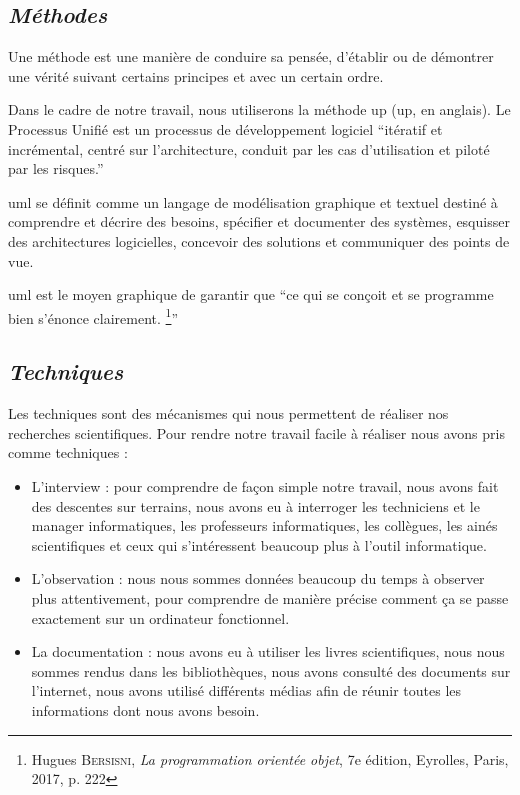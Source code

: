         \subsection[Méthodes]{\textit{Méthodes}}
        Une méthode est une manière de conduire sa pensée, d’établir ou de démontrer une
        vérité suivant certains principes et avec un certain ordre.
        \par
        Dans le cadre de notre travail, nous utiliserons la méthode \acrshort{up} (\acrlong{up}, en anglais).
        Le Processus Unifié est un processus de développement logiciel \enquote{itératif et incrémental,
        centré sur l’architecture, conduit par les cas d’utilisation et piloté par les risques.} \cite{Roques2008}
        \par
        \acrshort{uml} se définit comme un langage de modélisation graphique et textuel destiné à
        comprendre et décrire des besoins, spécifier et documenter des systèmes, esquisser des
        architectures logicielles, concevoir des solutions et communiquer des points de vue. \cite{RoqVall2007}
        \par
        \acrshort{uml} est le moyen graphique de garantir que \enquote{ce qui se conçoit et se programme
        bien s’énonce clairement. \footnote[2]{Hugues \textsc{Bersisni}, \textit{La programmation orientée objet}, 7e édition, Eyrolles, Paris, 2017, p. 222}}
        \subsection[Techniques]{\textit{Techniques}}
        Les techniques sont des mécanismes qui nous permettent de réaliser nos recherches
        scientifiques. Pour rendre notre travail facile à réaliser nous avons pris comme techniques : 
        \par
        \begin{itemize}
            \setlength{\itemsep}{0pt}
            \item [\ding{226}] L’interview : pour comprendre de façon simple notre travail, nous avons fait des
            descentes sur terrains, nous avons eu à interroger les techniciens et le manager
            informatiques, les professeurs informatiques, les collègues, les ainés scientifiques
            et ceux qui s’intéressent beaucoup plus à l’outil informatique.
            \item [\ding{226}] L’observation : nous nous sommes données beaucoup du temps à observer plus
            attentivement, pour comprendre de manière précise comment ça se passe exactement sur un ordinateur fonctionnel.
            \item [\ding{226}] La documentation : nous avons eu à utiliser les
            livres scientifiques, nous nous sommes rendus dans les bibliothèques, nous avons
            consulté des documents sur l’internet, nous avons utilisé différents médias afin de
            réunir toutes les informations dont nous avons besoin.
        \end{itemize}
